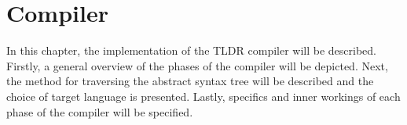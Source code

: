 \chapter{Compiler}{In this chapter, the implementation of the TLDR compiler will be described. Firstly, a general overview of the phases of the compiler will be depicted. Next, the method for traversing the abstract syntax tree will be described and the choice of target language is presented. Lastly, specifics and inner workings of each phase of the compiler will be specified.}
\label{part:implementation}









